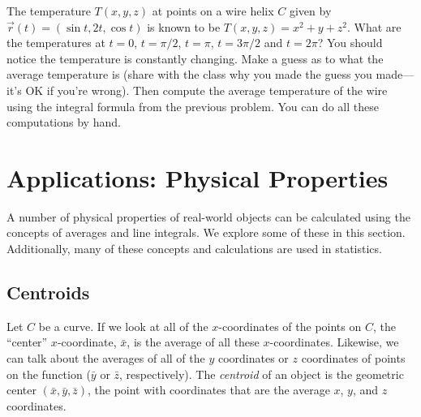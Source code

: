 \begin{problem}%
 The temperature $T(x,y,z)$ at points on a wire helix $C$ given by $\vec r(t) = (\sin t, 2t, \cos t)$ is known to be $T(x,y,z)=x^2+y+z^2$. What are the temperatures at $t=0$, $t=\pi/2$, $t=\pi$, $t=3\pi/2$ and $t=2\pi$?  You should notice the temperature is constantly changing.  Make a guess as to what the average temperature is (share with the class why you made the guess you made---it's OK if you're wrong). Then compute the average temperature of the wire using the integral formula from the previous problem. You can do all these computations by hand.
\end{problem}





\newpage

\section{Applications: Physical Properties}

A number of physical properties of real-world objects can be calculated using the concepts of averages and line integrals.  We explore some of these in this section.  Additionally, many of these concepts and calculations are used in statistics.

\subsection{Centroids}%

\begin{definition}[Centroid]
  Let $C$ be a curve. If we look at all of the $x$-coordinates of the points on $C$, the ``center'' $x$-coordinate, $\bar x$, is the average of all these $x$-coordinates.  Likewise, we can talk about the averages of all of the $y$ coordinates or $z$ coordinates of points on the function ($\bar y$ or $\bar z$, respectively).  The \emph{centroid} of an object is the geometric center $(\bar x, \bar y, \bar z)$, the point with coordinates that are the average $x$, $y$, and $z$ coordinates.
\end{definition}

